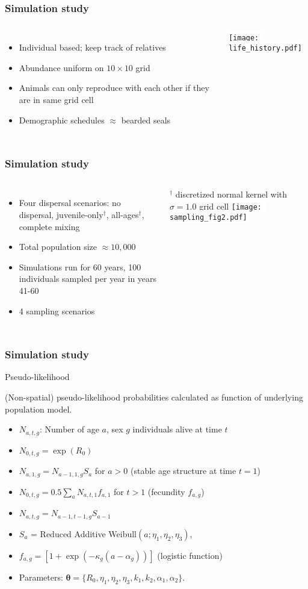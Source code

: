 \documentclass[serif,mathserif]{beamer}
\begin{document}
\begin{frame}
\frametitle{Simulation study}
  \begin{columns}[c]
  \column{2in}
\begin{itemize}
  \item Individual based; keep track of relatives
  \item Abundance uniform on $10 \times 10$ grid
  \item Animals can only reproduce with each other if
  they are in same grid cell
  \item Demographic schedules $\approx$ bearded seals
\end{itemize}
  \column{2in}
  \colorbox{white}{\texttt{[image: life\_history.pdf]}}
\end{columns}
\end{frame}

\begin{frame}
\frametitle{Simulation study}
  \begin{columns}[c]
  \column{2in}
\begin{itemize}
  \item Four dispersal scenarios: no dispersal, juvenile-only\textcolor{noaaturq}{$^\dag$}, all-ages\textcolor{noaaturq}{$^\dag$}, complete mixing
  \item Total population size $\approx 10,000$
  \item Simulations run for 60 years, 100 individuals sampled per year in years 41-60
  \item 4 sampling scenarios
\end{itemize}
     \textcolor{noaaturq}{$^\dag$ discretized normal kernel with $\sigma=1.0$ grid cell}
  \column{2in}
  \colorbox{white}{\texttt{[image: sampling\_fig2.pdf]}}
\end{columns}
\end{frame}

\begin{frame}
\frametitle{Simulation study}
\textcolor{noaaturq}{Pseudo-likelihood}

(Non-spatial) pseudo-likelihood probabilities calculated as function of underlying population model.

\begin{itemize}
\item $N_{a,t,g}$: Number of age $a$, sex $g$ individuals alive at time $t$
\item $N_{0,t,g} = \exp (R_0)$
\item $N_{a,1,g} = N_{a-1,1,g} S_a$ for $a>0$ (stable age structure at time $t=1$)
\item $N_{0,t,g} = 0.5 \sum_a N_{a,t,1} f_{a,1}$ for $t>1$ (fecundity $f_{a,g}$)
\item $N_{a,t,g} = N_{a-1,t-1,g} S_{a-1}$
\item $S_a$ = Reduced Additive Weibull$(a ; \eta_1,\eta_2,\eta_3)$,
\item $f_{a,g} = [1+\exp(-\kappa_g (a - \alpha_g))]$  (logistic function)
\item Parameters: $\boldsymbol{\theta} = \{ R_0, \eta_1, \eta_2, \eta_3, k_1, k_2,\alpha_1,\alpha_2 \}$.
\end{itemize}
\end{frame}
\end{document}
